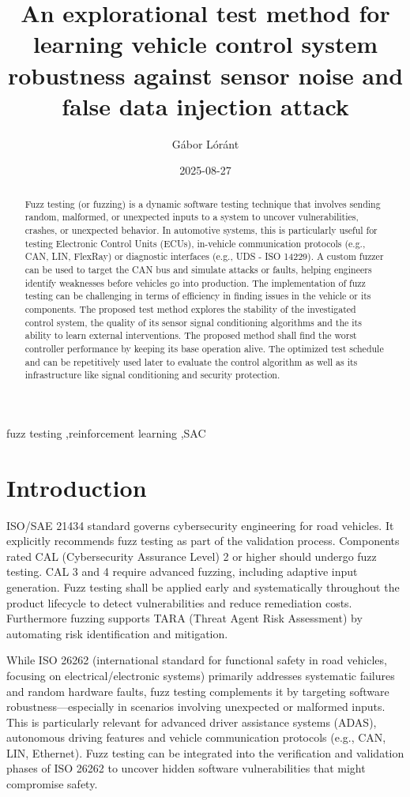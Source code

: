 \documentclass[a4paper, fleqn]{cas-dc}
\title[mode=title]{An explorational test method for learning vehicle control system robustness against sensor noise and false data injection attack}
\date{2025-08-27}
\author{Gábor Lóránt}
\begin{document}
	\begin{keywords}
		fuzz testing \sep reinforcement learning \sep SAC
	\end{keywords}
	
	
	\maketitle
	
	\begin{abstract}
		Fuzz testing (or fuzzing) is a dynamic software testing technique that involves sending random, malformed, or unexpected inputs to a system to uncover vulnerabilities, crashes, or unexpected behavior. In automotive systems, this is particularly useful for testing Electronic Control Units (ECUs), in-vehicle communication protocols (e.g., CAN, LIN, FlexRay) or diagnostic interfaces (e.g., UDS - ISO 14229). A custom fuzzer can be used to target the CAN bus and simulate attacks or faults, helping engineers identify weaknesses before vehicles go into production. The implementation of fuzz testing can be challenging in terms of efficiency in finding issues in the vehicle or its components. 
		The proposed test method explores the stability of the investigated control system, the quality of its sensor signal conditioning algorithms and the its ability to learn external interventions. The proposed method shall find the worst controller performance by keeping its base operation alive. The optimized test schedule and can be repetitively used later to evaluate the control algorithm as well as its infrastructure like signal conditioning and security protection.
	\end{abstract}
	
	\section{Introduction}
	ISO/SAE 21434 standard governs cybersecurity engineering for road vehicles. It explicitly recommends fuzz testing as part of the validation process. Components rated CAL (Cybersecurity Assurance Level) 2 or higher should undergo fuzz testing. CAL 3 and 4 require advanced fuzzing, including adaptive input generation. Fuzz testing shall be applied early and systematically throughout the product lifecycle to detect vulnerabilities and reduce remediation costs. Furthermore fuzzing supports TARA (Threat Agent Risk Assessment) by automating risk identification and mitigation.
	
	While ISO 26262 (international standard for functional safety in road vehicles, focusing on electrical/electronic systems) primarily addresses systematic failures and random hardware faults, fuzz testing complements it by targeting software robustness—especially in scenarios involving unexpected or malformed inputs. This is particularly relevant for advanced driver assistance systems (ADAS), autonomous driving features and vehicle communication protocols (e.g., CAN, LIN, Ethernet). Fuzz testing can be integrated into the verification and validation phases of ISO 26262 to uncover hidden software vulnerabilities that might compromise safety.
		
\end{document}
